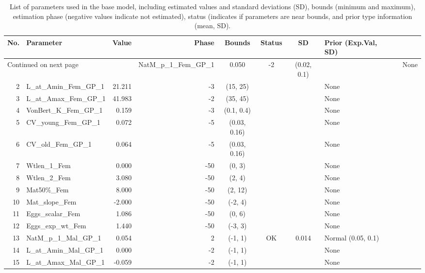 \documentclass[12pt,]{article}
\begin{document}
\begin{landscape}
\begin{longtable}{rlrrcccl}
\caption{List of parameters used in
                                              the base model, including estimated 
                                              values and standard deviations (SD), 
                                              bounds (minimum and maximum), 
                                              estimation phase (negative values indicate
                                              not estimated), status (indicates if 
                                              parameters are near bounds, and prior type
                                              information (mean, SD).} \\ 
  \hline
No. & Parameter & Value & Phase & Bounds & Status & SD & Prior (Exp.Val, SD)  \\ 
  \hline 
\endhead 
\hline 
\multicolumn{3}{l}{\footnotesize Continued on next page} 
\endfoot 
\endlastfoot 
 \hline
1 & NatM\_p\_1\_Fem\_GP\_1 & 0.050 & -2 & (0.02, 0.1) &  &  & None \\ 
  2 & L\_at\_Amin\_Fem\_GP\_1 & 21.211 & -3 & (15, 25) &  &  & None \\ 
  3 & L\_at\_Amax\_Fem\_GP\_1 & 41.983 & -2 & (35, 45) &  &  & None \\ 
  4 & VonBert\_K\_Fem\_GP\_1 & 0.159 & -3 & (0.1, 0.4) &  &  & None \\ 
  5 & CV\_young\_Fem\_GP\_1 & 0.072 & -5 & (0.03, 0.16) &  &  & None \\ 
  6 & CV\_old\_Fem\_GP\_1 & 0.064 & -5 & (0.03, 0.16) &  &  & None \\ 
  7 & Wtlen\_1\_Fem & 0.000 & -50 & (0, 3) &  &  & None \\ 
  8 & Wtlen\_2\_Fem & 3.080 & -50 & (2, 4) &  &  & None \\ 
  9 & Mat50\%\_Fem & 8.000 & -50 & (2, 12) &  &  & None \\ 
  10 & Mat\_slope\_Fem & -2.000 & -50 & (-2, 4) &  &  & None \\ 
  11 & Eggs\_scalar\_Fem & 1.086 & -50 & (0, 6) &  &  & None \\ 
  12 & Eggs\_exp\_wt\_Fem & 1.440 & -50 & (-3, 3) &  &  & None \\ 
  13 & NatM\_p\_1\_Mal\_GP\_1 & 0.054 & 2 & (-1, 1) & OK & 0.014 & Normal (0.05, 0.1) \\ 
  14 & L\_at\_Amin\_Mal\_GP\_1 & 0.000 & -2 & (-1, 1) &  &  & None \\ 
  15 & L\_at\_Amax\_Mal\_GP\_1 & -0.059 & -2 & (-1, 1) &  &  & None \\ 

\end{longtable}
\end{landscape}
\end{document}
